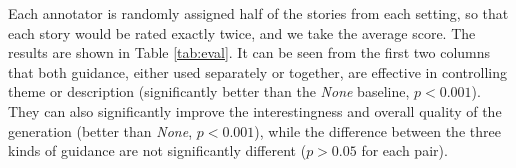 \documentclass{article}
\newcommand{\KZ}[1]{\textcolor{blue}{Kenny: #1}}
\begin{document}
Each annotator is randomly assigned half of the stories from each setting, 
so that each story would be rated exactly twice, and we take the average score. %
The results are shown in Table \ref{tab:eval}. It can be seen from the first 
two columns that both guidance, either used separately or together, are effective in controlling theme or description (significantly better than the \textit{None} baseline, $p < 0.001$). They can also significantly improve the interestingness and overall quality of the generation (better than \textit{None}, $p < 0.001$), while the difference between the three kinds of guidance are not significantly different ($p > 0.05$ for each pair). 



\end{document}
